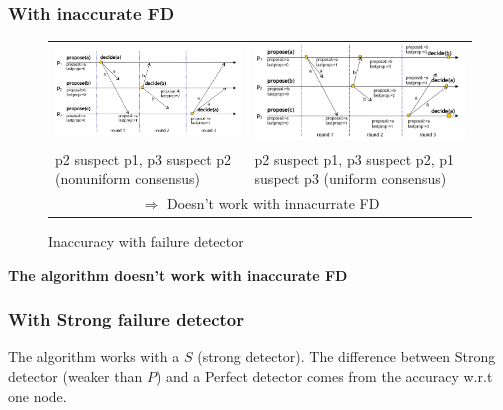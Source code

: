 \subsubsection{With inaccurate FD}

\begin{figure}[!ht]
    \centering
    \begin{tabular}{m{8cm}m{8cm}}
        \includegraphics[width=8cm]{img/hc_fd.png} &
        \includegraphics[width=8cm]{img/uhc_fd.png} \\
        p2 suspect p1, p3 suspect p2 (nonuniform consensus) &
        p2 suspect p1, p3 suspect p2, p1 suspect p3 (uniform consensus)\\
        \multicolumn{2}{c}{$\Rightarrow$ Doesn't work with innacurrate FD}
    \end{tabular}
        \caption{Inaccuracy with failure detector}
\end{figure}
\FloatBarrier{}

\textbf{The algorithm doesn't work with inaccurate FD}

\subsubsection{With Strong failure detector}

The algorithm works with a $S$ (strong detector). The difference between
Strong detector (weaker than $P$) and a Perfect detector comes from the
accuracy w.r.t one node.

